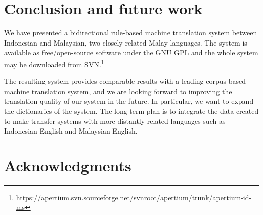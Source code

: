 \documentclass[10pt,a5paper,twoside]{article}
\begin{document}
\section*{Conclusion and future work}
We have presented a bidirectional rule-based machine translation system between Indonesian and Malaysian, two closely-related Malay languages. The system is available as free/open-source software under the GNU GPL and the whole system may be downloaded from SVN.\footnote{\url{https://apertium.svn.sourceforge.net/svnroot/apertium/trunk/apertium-id-ms}}

The resulting system provides comparable results with a leading corpus-based machine translation system, and we are looking forward to improving the translation quality of our system in the future. In particular, we want to expand the dictionaries of the system. The long-term plan is to integrate the data created to make transfer systems with more distantly related languages such as Indonesian-English and Malaysian-English.

\section*{Acknowledgments}




\nocite{lewis09}
\end{document}
